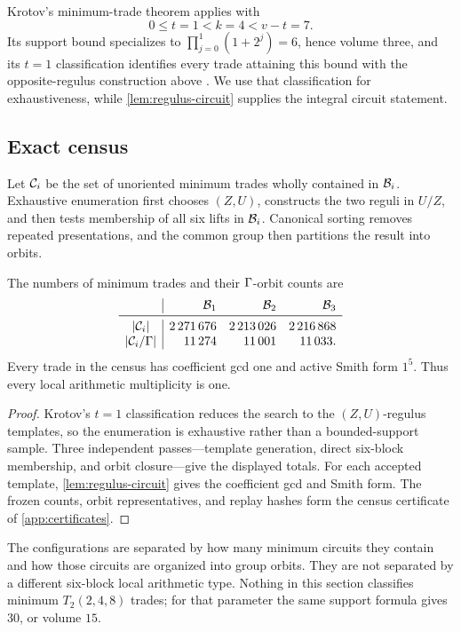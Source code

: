 Krotov's minimum-trade theorem applies with
\[
 0\le t=1<k=4<v-t=7.
\]
Its support bound specializes to
\(\prod_{j=0}^{1}(1+2^j)=6\), hence volume three, and its \(t=1\)
classification identifies every trade attaining this bound with the
opposite-regulus construction above \cite{Krotov2017}.  We use that
classification for exhaustiveness, while \cref{lem:regulus-circuit}
supplies the integral circuit statement.

\subsection{Exact census}

Let \(\mathcal C_i\) be the set of unoriented minimum trades wholly contained in
\(\mathcal B_i\).  Exhaustive enumeration first chooses \((Z,U)\), constructs
the two reguli in \(U/Z\), and then tests membership of all six lifts in
\(\mathcal B_i\).  Canonical sorting removes repeated presentations, and the
common group then partitions the result into orbits.

\begin{proposition}
\label{prop:circuit-census}
The numbers of minimum trades and their \(\Gamma\)-orbit counts are
\[
\begin{array}{c|rrr}
 &\cB_1&\cB_2&\cB_3\\
\midrule
|\cC_i|&
2\,271\,676&2\,213\,026&2\,216\,868\\
|\cC_i/\GammaG|&
11\,274&11\,001&11\,033.
\end{array}
\]
Every trade in the census has coefficient gcd one and active Smith form
\(1^5\).  Thus every local arithmetic multiplicity is one.
\end{proposition}

\begin{proof}
Krotov's \(t=1\) classification reduces the search to the
\((Z,U)\)-regulus templates, so the enumeration is exhaustive rather
than a bounded-support sample.  Three independent passes---template
generation, direct six-block membership, and orbit closure---give the
displayed totals.  For each accepted template,
\cref{lem:regulus-circuit} gives the coefficient gcd and Smith form.
The frozen counts, orbit representatives, and replay hashes form the
census certificate of \cref{app:certificates}.
\end{proof}

\begin{remark}
The configurations are separated by how many minimum circuits they
contain and how those circuits are organized into group orbits.  They are
not separated by a different six-block local arithmetic type.
Nothing in this section classifies minimum \(T_2(2,4,8)\) trades; for that
parameter the same support formula gives \(30\), or volume \(15\).
\end{remark}

